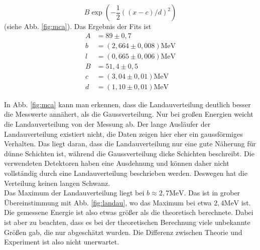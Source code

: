 \[B\exp{\left(-\frac{1}{2}((x-c)/d)^2 \right)}\]
 (siehe Abb. \ref{fig:mca}). Das Ergebnis der Fits ist
 \begin{align}
 A &= 89 \pm 0,7\\
 b &= (2,664 \pm 0,008)\si{\mega\eV}\\
 l &= (0,665  \pm 0,006)\si{\mega\eV}\\
 B &= 51,4 \pm 0,5\\
 c &= (3,04\pm 0,01)\si{\mega\eV}\\
 d &=( 1,10 \pm 0,01) \si{\mega\eV}
 \end{align}
 
In Abb. \ref{fig:mca} kann man erkennen, dass die Landauverteilung deutlich besser die Messwerte annähert, als die Gaussverteilung. Nur bei großen Energien weicht die Landauverteilung von der Messung ab. Der lange Ausläufer der Landauverteilung existiert nicht, die Daten zeigen hier eher ein gaussförmiges Verhalten. Das liegt daran, dass die Landauverteilung nur eine gute Näherung für dünne Schichten ist, während die Gaussverteilung dicke Schichten beschreibt. Die verwendeten Detektoren haben eine Ausdehnung und können daher nicht vollständig durch eine Landauverteilung beschrieben werden. Deswegen hat die Verteilung keinen langen Schwanz.\\

Das Maximum der Landauverteilung liegt bei $b \approx 2,7\si{\mega\eV}$. Das ist in grober Übereinstimmung mit Abb. \ref{fig:landau}, wo das Maximum bei etwa $2,4\si{\mega\eV}$ ist. Die gemessene Energie ist also etwas größer als die theoretisch berechnete. Dabei ist aber zu beachten, dass es bei der theoretischen Berechnung viele unbekannte Größen gab, die nur abgeschätzt wurden. Die Differenz zwischen Theorie und Experiment ist also nicht unerwartet.